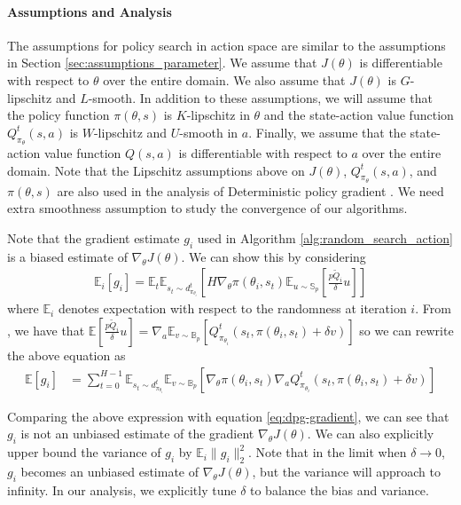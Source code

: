 \paragraph{Assumptions and Analysis}
\label{sec:assumptions_action}

The assumptions for policy search in action space are similar to the
assumptions in Section \ref{sec:assumptions_parameter}. We assume that
$J(\theta)$ is differentiable with respect to $\theta$ over the entire domain. We
also assume that $J(\theta)$ is $G$-lipschitz and $L$-smooth. In
addition to these assumptions, we will assume that the policy function
$\pi(\theta, s)$ is $K$-lipschitz in $\theta$ and the state-action
value function $Q^t_{\pi_\theta}(s, a)$ is $W$-lipschitz and $U$-smooth in $a$. Finally, we assume that the state-action value function $Q(s,a)$ is differentiable with respect to $a$ over the entire domain.  Note that the Lipschitz assumptions above on $J(\theta)$, $Q^{t}_{\pi_{\theta}}(s,a)$, and $\pi(\theta,s)$ are also used in the analysis of Deterministic policy gradient \citep{silver2014deterministic}. We need extra smoothness assumption to study the convergence of our algorithms. 

Note that the gradient estimate $g_i$ used in
Algorithm \ref{alg:random_search_action} is a biased estimate
of $\nabla_\theta J(\theta)$. We can show this by considering
\begin{align*}
  \mathbb{E}_i[g_i] = \mathbb{E}_t \mathbb{E}_{s_t \sim
  d_{\pi_{\theta_i}}^t}\left[H\nabla_\theta \pi(\theta_i, s_t) \mathbb{E}_{u
  \sim \mathbb{S}_p}\left[\frac{p\tilde{Q}_i}{\delta}u\right]\right]
\end{align*}
where $\mathbb{E}_i$ denotes expectation with respect to the randomness at iteration $i$.
From \citep{flaxman2005online}, we have that $\mathbb{E}[\frac{p\tilde{Q}_i}{\delta}u] = \nabla_a \mathbb{E}_{v
\sim \mathbb{B}_p}[Q_{\pi_{\theta_i}}^t(s_t, \pi(\theta_i, s_t) + \delta v)]$ so we can rewrite the above equation as
\begin{align*}
  \mathbb{E}[g_i]
  &= \sum_{t=0}^{H-1}\mathbb{E}_{s_t \sim
    d_{\pi_{\theta_i}}^t}\mathbb{E}_{v \sim
    \mathbb{B}_p}\left[\nabla_\theta \pi(\theta_i, s_t)\nabla_a
    Q_{\pi_{\theta_i}}^t(s_t, \pi(\theta_i, s_t) + \delta v)\right]
\end{align*}

Comparing the above expression with equation \ref{eq:dpg-gradient}, we can see that $g_i$ is not an unbiased
estimate of the gradient $\nabla_\theta J(\theta)$. We can also explicitly upper bound the variance of $g_i$ by $\mathbb{E}_i\|g_i\|_2^2$. Note that in the limit when $\delta\to 0$, $g_i$ becomes an unbiased estimate of $\nabla_{\theta}J(\theta)$, but the variance will approach to infinity. In our analysis, we explicitly tune $\delta$ to balance the bias and variance. 

